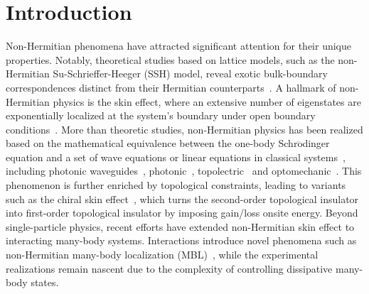 \documentclass[longbibliography, aps, prx, amsmath, amssymb, amsfonts, twocolumn,superscriptaddress, footinbib]{revtex4-1}
\begin{document}
	\section{Introduction}
	Non-Hermitian phenomena have attracted significant attention for their unique properties. Notably, theoretical studies based on lattice models, such as the non-Hermitian Su-Schrieffer-Heeger (SSH) model, reveal exotic bulk-boundary correspondences distinct from their Hermitian counterparts~\cite{RN1166,RN1168}. 
	A hallmark of non-Hermitian physics is the skin effect, where an extensive number of eigenstates are exponentially localized at the system's boundary under open boundary conditions~\cite{gong2018topological,kawabata2019symmetry,RN1212,RN1214,RN1217,RN1160}. %
	More than theoretic studies, non-Hermitian physics has been realized based on the mathematical equivalence between the one-body Schr$\ddot{\mathrm{o}}$dinger equation and a set of wave equations or linear equations in classical systems~\cite{RN1161}, including photonic waveguides~\cite{nie2023non}, photonic~\cite{RN1165,RN1167,RN1227}, topolectric~\cite{zou2021observation,RN2,RN1225} and optomechanic~\cite{RN632,RN1226}. 
	This phenomenon is further enriched by topological constraints, leading to variants such as the chiral skin effect~\cite{nakamura2023universal, ma2024non,schindler2023hermitian}, which turns the second-order topological insulator into first-order topological insulator by imposing gain/loss onsite energy. 
	Beyond single-particle physics, recent efforts have extended non-Hermitian skin effect to interacting many-body systems. %
	Interactions introduce novel phenomena such as non-Hermitian many-body localization (MBL)~\cite{mak2024statics,hamazaki2019non}, while the experimental realizations remain nascent due to the complexity of controlling dissipative many-body states.
\end{document}
